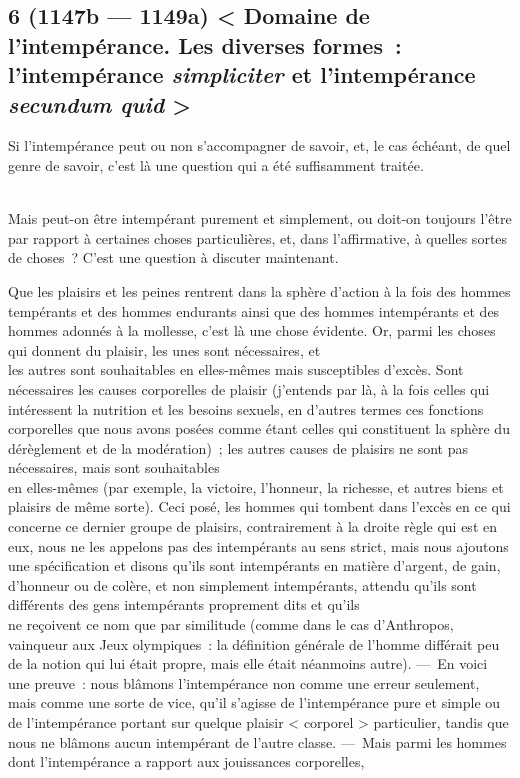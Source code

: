 \documentclass[french,twoside]{book} %
\begin{document}
\subsection[{6 (1147b — 1149a) < Domaine de l’intempérance. Les diverses formes : l’intempérance simpliciter et l’intempérance secundum quid >}]{6 (1147b — 1149a) < Domaine de l’intempérance. Les diverses formes : l’intempérance {\itshape simpliciter} et l’intempérance {\itshape secundum quid} >}
\noindent Si l’intempérance peut ou non s’accompagner de savoir, et, le cas échéant, de quel genre de savoir, c’est là une question qui a été suffisamment traitée.\par
\\
Mais peut-on être intempérant purement et simplement, ou doit-on toujours l’être par rapport à certaines choses particulières, et, dans l’affirmative, à quelles sortes de choses ? C’est une question à discuter maintenant.\par
Que les plaisirs et les peines rentrent dans la sphère d’action à la fois des hommes tempérants et des hommes endurants ainsi que des hommes intempérants et des hommes adonnés à la mollesse, c’est là une chose évidente. Or, parmi les choses qui donnent du plaisir, les unes sont nécessaires, et \\
les autres sont souhaitables en elles-mêmes mais susceptibles d’excès. Sont nécessaires les causes corporelles de plaisir (j’entends par là, à la fois celles qui intéressent la nutrition et les besoins sexuels, en d’autres termes ces fonctions corporelles que nous avons posées comme étant celles qui constituent la sphère du dérèglement et de la modération) ; les autres causes de plaisirs ne sont pas nécessaires, mais sont souhaitables \\
en elles-mêmes (par exemple, la victoire, l’honneur, la richesse, et autres biens et plaisirs de même sorte). Ceci posé, les hommes qui tombent dans l’excès en ce qui concerne ce dernier groupe de plaisirs, contrairement à la droite règle qui est en eux, nous ne les appelons pas des intempérants au sens strict, mais nous ajoutons une spécification et disons qu’ils sont intempérants en matière d’argent, de gain, d’honneur ou de colère, et non simplement intempérants, attendu qu’ils sont différents des gens intempérants proprement dits et qu’ils \\
ne reçoivent ce nom que par similitude (comme dans le cas d’Anthropos, vainqueur aux Jeux olympiques : la définition  générale de l’homme différait peu de la notion qui lui était propre, mais elle était néanmoins autre). — En voici une preuve : nous blâmons l’intempérance non comme une erreur seulement, mais comme une sorte de vice, qu’il s’agisse de l’intempérance pure et simple ou de l’intempérance portant sur quelque plaisir < corporel > particulier, tandis que nous ne blâmons aucun intempérant de l’autre classe. — Mais parmi les hommes dont l’intempérance a rapport aux jouissances corporelles, \\
\end{document}
